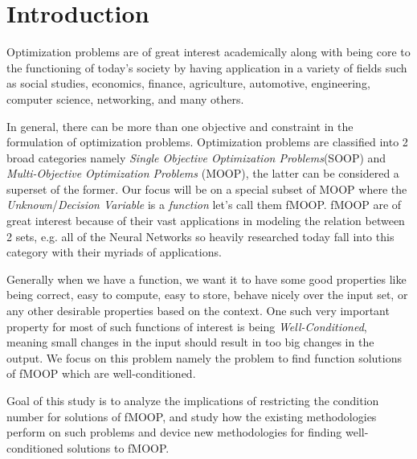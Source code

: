 \chapter{Introduction}

\hspace{1cm}Optimization problems are of great interest academically along with being core to the functioning of today's society by having application in a variety of fields such as social studies, economics, finance, agriculture, automotive, engineering, computer science, networking, and many others.

In general, there can be more than one objective and constraint in the formulation of optimization problems. Optimization problems are classified into 2 broad categories namely \textit{Single Objective Optimization Problems}(SOOP) and \textit{Multi-Objective Optimization Problems} (MOOP), the latter can be considered a superset of the former. Our focus will be on a special subset of MOOP where the \textit{Unknown}/\textit{Decision Variable} is a \textit{function} let's call them fMOOP. fMOOP are of great interest because of their vast applications in modeling the relation between 2 sets, e.g. all of the Neural Networks so heavily researched today fall into this category with their myriads of applications.

Generally when we have a function, we want it to have some good properties like being correct, easy to compute, easy to store, behave nicely over the input set, or any other desirable properties based on the context. One such very important property for most of such functions of interest is being \textit{Well-Conditioned}, meaning small changes in the input should result in too big changes in the output. We focus on this problem namely the problem to find function solutions of fMOOP which are well-conditioned.

Goal of this study is to analyze the implications of restricting the condition number for solutions of fMOOP, and study how the existing methodologies perform on such problems and device new methodologies for finding well-conditioned solutions to fMOOP.

